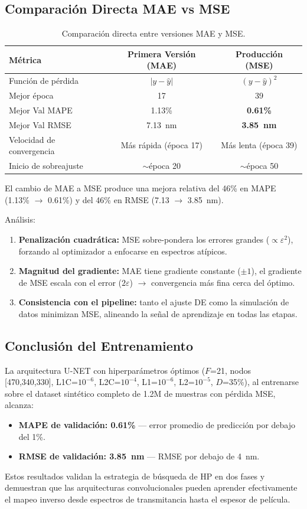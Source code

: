 \documentclass{article}
\begin{document}
\subsection{Comparación Directa MAE vs MSE}

\begin{table}[htbp]
\centering
\caption{Comparación directa entre versiones MAE y MSE.}
\label{tab:mae-vs-mse}
\begin{tabular}{lcc}
\hline
Métrica & Primera Versión (MAE) & Producción (MSE) \\
\hline
Función de pérdida & $|y - \hat{y}|$ & $(y - \hat{y})^2$ \\
Mejor época   & 17 & 39 \\
Mejor Val MAPE  & 1.13\% & \textbf{0.61\%} \\
Mejor Val RMSE  & 7.13~nm & \textbf{3.85~nm} \\
Velocidad de convergencia & Más rápida (época 17) & Más lenta (época 39) \\
Inicio de sobreajuste & $\sim$época 20 & $\sim$época 50 \\
\hline
\end{tabular}
\end{table}

El cambio de MAE a MSE produce una mejora relativa del 46\% en MAPE (1.13\% $\rightarrow$ 0.61\%) y del 46\% en RMSE (7.13 $\rightarrow$ 3.85~nm).

Análisis:
\begin{enumerate}
\item \textbf{Penalización cuadrática:} MSE sobre-pondera los errores grandes ($\propto \varepsilon^2$), forzando al optimizador a enfocarse en espectros atípicos.
\item \textbf{Magnitud del gradiente:} MAE tiene gradiente constante ($\pm 1$), el gradiente de MSE escala con el error ($2\varepsilon$) $\rightarrow$ convergencia más fina cerca del óptimo.
\item \textbf{Consistencia con el pipeline:} tanto el ajuste DE como la simulación de datos minimizan MSE, alineando la señal de aprendizaje en todas las etapas.
\end{enumerate}

\subsection{Conclusión del Entrenamiento}

La arquitectura U-NET con hiperparámetros óptimos ($F$=21, nodos [470,340,330], L1C=$10^{-6}$, L2C=$10^{-4}$, L1=$10^{-6}$, L2=$10^{-5}$, $D$=35\%), al entrenarse sobre el dataset sintético completo de 1.2M de muestras con pérdida MSE, alcanza:
\begin{itemize}
\item \textbf{MAPE de validación: 0.61\%} — error promedio de predicción por debajo del 1\%.
\item \textbf{RMSE de validación: 3.85~nm} — RMSE por debajo de 4~nm.
\end{itemize}
Estos resultados validan la estrategia de búsqueda de HP en dos fases y demuestran que las arquitecturas convolucionales pueden aprender efectivamente el mapeo inverso desde espectros de transmitancia hasta el espesor de película.
\end{document}
